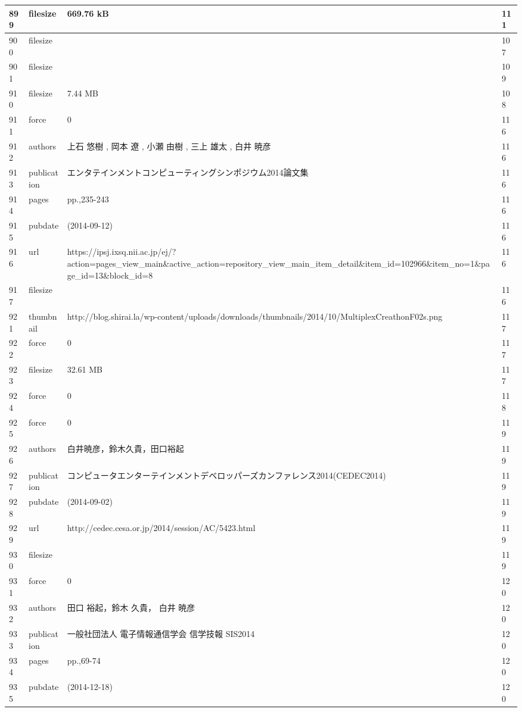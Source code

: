 \begin{longtable}{|l|l|l|l|}
899 & filesize & 669.76 kB & 111 \\ \hline 
900 & filesize &  & 107 \\ \hline 
901 & filesize &  & 109 \\ \hline 
910 & filesize & 7.44 MB & 108 \\ \hline 
911 & force & 0 & 116 \\ \hline 
912 & authors & 上石 悠樹 , 岡本 遼 , 小瀬 由樹 , 三上 雄太 , 白井 暁彦  & 116 \\ \hline 
913 & publication & エンタテインメントコンピューティングシンポジウム2014論文集 & 116 \\ \hline 
914 & pages & pp.,235-243 & 116 \\ \hline 
915 & pubdate &  (2014-09-12)  & 116 \\ \hline 
916 & url & https://ipsj.ixsq.nii.ac.jp/ej/?action=pages\_view\_main\&active\_action=repository\_view\_main\_item\_detail\&item\_id=102966\&item\_no=1\&page\_id=13\&block\_id=8 & 116 \\ \hline 
917 & filesize &  & 116 \\ \hline 
921 & thumbnail & http://blog.shirai.la/wp-content/uploads/downloads/thumbnails/2014/10/MultiplexCreathonF02s.png & 117 \\ \hline 
922 & force & 0 & 117 \\ \hline 
923 & filesize & 32.61 MB & 117 \\ \hline 
924 & force & 0 & 118 \\ \hline 
925 & force & 0 & 119 \\ \hline 
926 & authors & 白井暁彦，鈴木久貴，田口裕起 & 119 \\ \hline 
927 & publication & コンピュータエンターテインメントデベロッパーズカンファレンス2014(CEDEC2014) & 119 \\ \hline 
928 & pubdate &  (2014-09-02)  & 119 \\ \hline 
929 & url & http://cedec.cesa.or.jp/2014/session/AC/5423.html & 119 \\ \hline 
930 & filesize &  & 119 \\ \hline 
931 & force & 0 & 120 \\ \hline 
932 & authors & 田口 裕起，鈴木 久貴， 白井 暁彦 & 120 \\ \hline 
933 & publication & 一般社団法人 電子情報通信学会 信学技報 SIS2014 & 120 \\ \hline 
934 & pages & pp.,69-74 & 120 \\ \hline 
935 & pubdate & (2014-12-18) & 120 \\ \hline 

\end{longtable}
